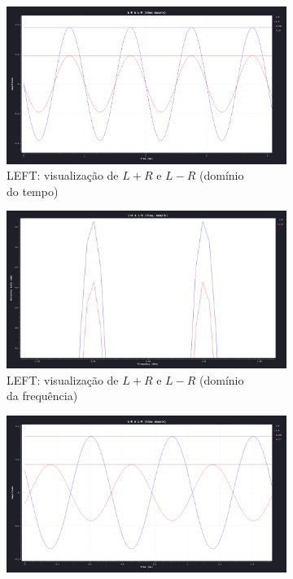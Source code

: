\begin{figure}[ht] 
    \begin{subfigure}[b]{0.5\linewidth}
        \centering
        \includegraphics[width=0.8\linewidth]{img/1_2LEFT.png}
        \caption{LEFT: visualização de $L+R$ e $L-R$ (domínio \\ do tempo)} 
        \label{fig:aaa} 
        \vspace{1ex}
    \end{subfigure}%
    \begin{subfigure}[b]{0.5\linewidth}
        \centering
        \includegraphics[width=0.8\linewidth]{img/1_2LEFTdB.png} 
        \caption{LEFT: visualização de $L+R$ e $L-R$ (domínio \\ da frequência)} 
        \label{fig:bbb} 
        \vspace{1ex}
    \end{subfigure} 
    \begin{subfigure}[b]{0.5\linewidth}
        \centering
        \includegraphics[width=0.8\linewidth]{img/1_2RIGHT.png}

\end{subfigure}
\end{figure}
